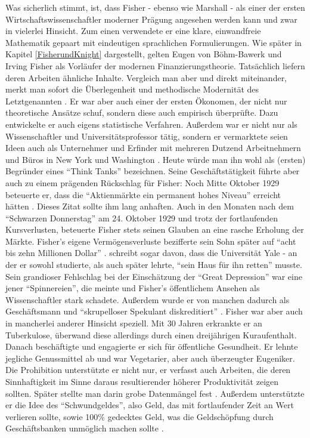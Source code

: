 Was sicherlich stimmt, ist, dass Fisher - ebenso wie Marshall - als einer der ersten Wirtschaftswissenschaftler moderner Prägung angesehen werden kann und zwar in vielerlei Hinsicht. Zum einen verwendete er eine klare, einwandfreie Mathematik gepaart mit eindeutigen sprachlichen Formulierungen. Wie später in Kapitel \ref{FisherundKnight} dargestellt, gelten Eugen von Böhm-Bawerk und Irving Fisher als Vorläufer der modernen Finanzierungstheorie. Tatsächlich liefern deren Arbeiten ähnliche Inhalte. Vergleich man aber \textcite{BohmBawerk1888} und \textcite{Fisher1930} direkt miteinander, merkt man sofort die Überlegenheit und methodische Modernität des Letztgenannten \parencite[S. 33 ]{Tobin1985}. Er war aber auch einer der ersten Ökonomen, der nicht nur theoretische Ansätze schuf, sondern diese auch empirisch überprüfte. Dazu entwickelte er auch eigens statistische Verfahren. Außerdem war er nicht nur als Wissenschaftler und Universitätsprofessor tätig, sondern er vermarktete seien Ideen auch als Unternehmer und Erfinder mit mehreren Dutzend Arbeitnehmern und Büros in New York und Washington \parencite[S. 215]{Monissen1989}. Heute würde man ihn wohl als (ersten) Begründer eines "`Think Tanks"' bezeichnen. Seine Geschäftstätigkeit führte aber auch zu einem prägenden Rückschlag für Fisher: Noch Mitte Oktober 1929 beteuerte er, dass die "`Aktienmärkte ein permanent hohes Niveau"' erreicht hätten \parencite[S. 11]{Dimand2005}. Dieses Zitat sollte ihm lang anhaften. Auch in den Monaten nach dem "`Schwarzen Donnerstag"' am 24. Oktober 1929 und trotz der fortlaufenden Kursverlusten, beteuerte Fisher stets seinen Glauben an eine rasche Erholung der Märkte. Fisher's eigene Vermögensverluste bezifferte sein Sohn später auf "`acht bis zehn Millionen Dollar"' \parencite[S. 216]{Monissen1989}. \textcite[S. 30]{Tobin1985} schreibt sogar davon, dass die Universität Yale - an der er sowohl studierte, als auch später lehrte, "`sein Haus für ihn retten"' musste. 
Sein grandioser Fehlschlag bei der Einschätzung der "`Great Depression"' war eine jener "`Spinnereien"', die \textcite{Schumpeter1954} meinte und Fisher's öffentlichem Ansehen als Wissenschaftler stark schadete. Außerdem wurde er von manchen dadurch als Geschäftsmann und "`skrupelloser Spekulant diskreditiert"' \parencite[S. 216]{Monissen1989}. Fisher war aber auch in mancherlei anderer Hinsicht speziell. Mit 30 Jahren erkrankte er an Tuberkulose, überwand diese allerdings durch einen dreijährigen Kuraufenthalt. Danach beschäftigte und engagierte er sich für öffentliche Gesundheit. Er lehnte jegliche Genussmittel ab und war Vegetarier, aber auch überzeugter Eugeniker. Die Prohibition unterstützte er nicht nur, er verfasst auch Arbeiten, die deren Sinnhaftigkeit im Sinne daraus resultierender höherer Produktivität zeigen sollten. Später stellte man darin grobe Datenmängel fest \parencite[S. 215]{Monissen1989}. Außerdem unterstützte er die Idee des "`Schwundgeldes"', also Geld, das mit fortlaufender Zeit an Wert verlieren sollte, sowie 100\% gedecktes Geld, was die Geldschöpfung durch Geschäftsbanken unmöglich machen sollte \parencite[S. 30]{Tobin1985}.

